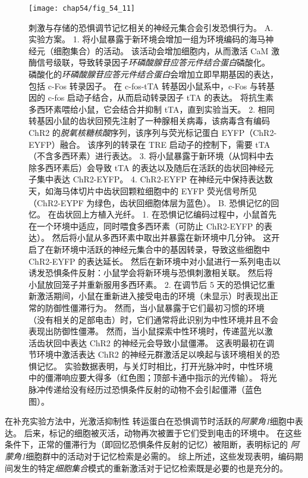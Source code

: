 \begin{figure}[htbp]
	\centering
	\texttt{[image: chap54/fig\_54\_11]}
	\caption{刺激与存储的恐惧调节记忆相关的神经元集合会引发恐惧行为\cite{liu2012optogenetic}。
		A. 实验方案。
		1. 将小鼠暴露于新环境会增加一组为环境编码的海马神经元（细胞集合）的活动。
		该活动会增加细胞内，从而激活 CaM 激酶信号级联，导致转录因子\textit{环磷酸腺苷应答元件结合蛋白}磷酸化。
		磷酸化的\textit{环磷酸腺苷应答元件结合蛋白}会增加立即早期基因的表达，包括 c-Fos 转录因子。
		在 c-fos-tTA 转基因小鼠系中，c-Fos 与转基因的 c-fos 启动子结合，从而启动转录因子 tTA 的表达。
		将抗生素多西环素喂给小鼠，它会结合并抑制 tTA，直到实验当天。
		2. 相同转基因小鼠的齿状回预先注射了一种腺相关病毒，该病毒含有编码 ChR2 的\textit{脱氧核糖核酸}序列，该序列与荧光标记蛋白 EYFP（ChR2-EYFP）融合。
		该序列的转录在 TRE 启动子的控制下，需要 tTA（不含多西环素）进行表达。
		3. 将小鼠暴露于新环境（从饲料中去除多西环素后）会导致 tTA 的表达以及随后在活跃的齿状回神经元子集中表达 ChR2-EYFP。
		4. ChR2-EYFP 在神经元中保持表达数天，如海马体切片中齿状回颗粒细胞中的 EYFP 荧光信号所见（ChR2-EYPF 为绿色，齿状回细胞体层为蓝色）。 
		B. 恐惧记忆的回忆。
		在齿状回上方植入光纤。
		1. 在恐惧记忆编码过程中，小鼠首先在一个环境中适应，同时喂食多西环素（可防止 ChR2-EYFP 的表达）。
		然后将小鼠从多西环素中取出并暴露在新环境中几分钟。
		这开启了在新环境中活跃的神经元集合中的基因转录，导致这些细胞中 ChR2-EYFP 的表达延长。
		然后在新环境中对小鼠进行一系列电击以诱发恐惧条件反射：小鼠学会将新环境与恐惧刺激相关联。
		然后将小鼠放回笼子并重新服用多西环素。
		2. 在调节后 5 天的恐惧记忆重新激活期间，小鼠在重新进入接受电击的环境（未显示）时表现出正常的防御性僵滞行为。
		然而，当小鼠暴露于它们最初习惯的环境（没有相关的足部电击）时，它们通常将此识别为中性环境并且不会表现出防御性僵滞。
		然而，当小鼠探索中性环境时，传递蓝光以激活齿状回中表达 ChR2 的神经元会导致小鼠僵滞。
		这表明最初在调节环境中激活表达 ChR2 的神经元群激活足以唤起与该环境相关的恐惧记忆。
		实验数据表明，与关灯时相比，打开光脉冲时，中性环境中的僵滞响应要大得多（红色图；顶部卡通中指示的光传输）。
		将光脉冲传递给没有经历过恐惧条件反射的动物不会引起僵滞（蓝色图）。}
	\label{fig:54_11}
\end{figure}


在补充实验方法中，光激活抑制性  转运蛋白在恐惧调节时活跃的\textit{阿蒙角1}细胞中表达。
后来，标记的细胞被灭活，动物再次被置于它们受到电击的环境中。
在这些条件下，正常的僵滞行为（即回忆恐惧条件反射的记忆）被阻断，表明标记的 \textit{阿蒙角1}细胞群中的活动对于记忆检索是必需的。
综上所述，这些发现表明，编码期间发生的特定\textit{细胞集合}模式的重新激活对于记忆检索既是必要的也是充分的。


